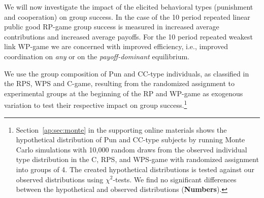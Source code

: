 \documentclass[11pt,a4paper]{article}
\begin{document}
\begin{refsection}
We will now investigate the impact of the elicited behavioral types (punishment
and cooperation) on group success. In the case of
the 10 period repeated linear public good RP-game group success is measured in
increased average contributions and
increased average payoffs. For the 10 period repeated weakest link WP-game we
are concerned with improved efficiency, i.e., improved coordination on
\emph{any} or on the \emph{payoff-dominant} equilibrium.

We use the group composition of Pun and CC-type
individuals, as classified in the RPS, WPS
and C-game, resulting from the randomized assignment to experimental groups at the beginning of
the RP and WP-game as exogenous variation to test their respective impact on
group success.\footnote{Section~\ref{ap:sec:monte} in the
  supporting online materials shows the hypothetical distribution of Pun and
  CC-type subjects by running Monte Carlo simulations with 10,000 random draws
  from the observed individual type distribution in the C, RPS, and WPS-game
  with randomized assignment into groups of 4. The created hypothetical
  distributions is tested against our observed distributions using $\chi^2$-tests. We find no
  significant differences between the hypothetical and observed distributions (\textbf{Numbers}).}


\end{refsection}
\end{document}
